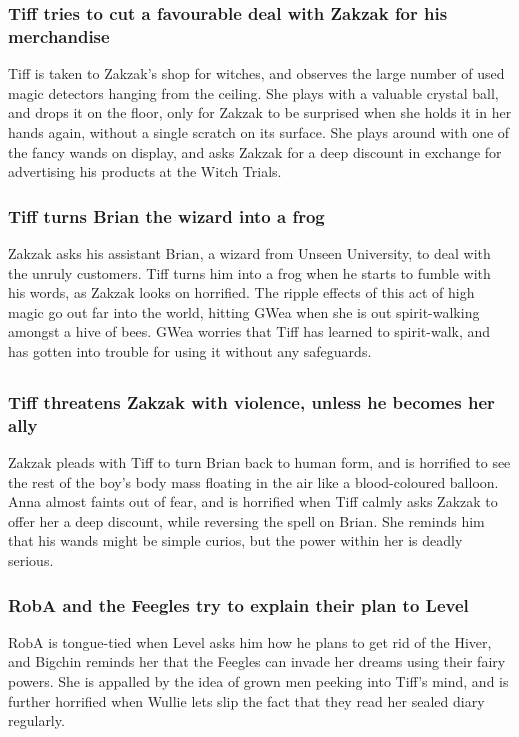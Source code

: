 \subsubsection{\Gls{Tiff} tries to cut a favourable deal with \Gls{Zakzak} for his merchandise}
\Gls{Tiff} is taken to \Gls{Zakzak}'s shop for witches, and observes the large number of used
magic detectors hanging from the ceiling. She plays with a valuable crystal ball, and drops it on
the floor, only for \Gls{Zakzak} to be surprised when she holds it in her hands again, without a
single scratch on its surface. She plays around with one of the fancy wands on display, and asks
\Gls{Zakzak} for a deep discount in exchange for advertising his products at the Witch Trials.

\subsubsection{\Gls{Tiff} turns \Gls{Brian} the wizard into a frog}
\Gls{Zakzak} asks his assistant \Gls{Brian}, a wizard from Unseen University, to deal with the
unruly customers. \Gls{Tiff} turns him into a frog when he starts to fumble with his words, as
\Gls{Zakzak} looks on horrified. The ripple effects of this act of high magic go out far into the
world, hitting \Gls{GWea} when she is out spirit-walking amongst a hive of bees. \Gls{GWea} worries
that \Gls{Tiff} has learned to spirit-walk, and has gotten into trouble for using it without any
safeguards.

\subsection{}
\subsubsection{\Gls{Tiff} threatens \Gls{Zakzak} with violence, unless he becomes her ally}
\Gls{Zakzak} pleads with \Gls{Tiff} to turn \Gls{Brian} back to human form, and is horrified to
see the rest of the boy's body mass floating in the air like a blood-coloured balloon. \Gls{Anna}
almost faints out of fear, and is horrified when \Gls{Tiff} calmly asks \Gls{Zakzak} to offer her
a deep discount, while reversing the spell on \Gls{Brian}. She reminds him that his wands might be
simple curios, but the power within her is deadly serious.

\subsubsection{\Gls{RobA} and the Feegles try to explain their plan to \Gls{Level}}
\Gls{RobA} is tongue-tied when \Gls{Level} asks him how he plans to get rid of the \Gls{Hiver}, and
\Gls{Bigchin} reminds her that the Feegles can invade her dreams using their fairy powers. She
is appalled by the idea of grown men peeking into \Gls{Tiff}'s mind, and is further horrified when
\Gls{Wullie} lets slip the fact that they read her sealed diary regularly.

